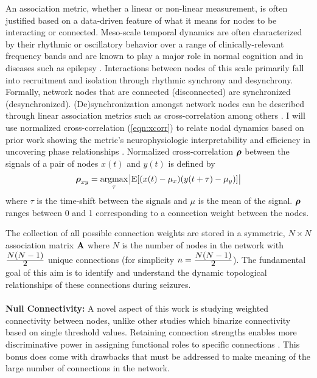 An association metric, whether a linear or non-linear measurement, is often justified based on a data-driven feature of what it means for nodes to be interacting or connected. Meso-scale temporal dynamics are often characterized by their rhythmic or oscillatory behavior over a range of clinically-relevant frequency bands and are known to play a major role in normal cognition \cite{buzsaki2006rhythms} and in diseases such as epilepsy \cite{uhlhaas2006neural, jiruska2012synchronization}. Interactions between nodes of this scale primarily fall into recruitment and isolation through rhythmic synchrony and desynchrony. Formally, network nodes that are connected (disconnected) are synchronized (desynchronized). (De)synchronization amongst network nodes can be described through linear association metrics such as cross-correlation among others \cite{pereda2005nonlinear}. I will use normalized cross-correlation (\ref{eqn:xcorr}) to relate nodal dynamics based on prior work showing the metric's neurophysiologic interpretability and efficiency in uncovering phase relationships \cite{schiff2005neuronal, kramer2010coalescence}. Normalized cross-correlation $\boldsymbol{\displaystyle \rho}$ between the signals of a pair of nodes $x(t)$ and $y(t)$ is defined by
\begin{eqnarray}
\label{eqn:xcorr}
    \boldsymbol{\displaystyle \rho}_{xy} = \underset{\tau}{\operatorname{argmax}}\:{\abs{\mathrm{E}[(x(t) - \mu_{x})(y(t+\tau) - \mu_{y})]}}
\end{eqnarray}
where $\tau$ is the time-shift between the signals and $\mu$ is the mean of the signal. $\boldsymbol{\displaystyle \rho}$ ranges between 0 and 1 corresponding to a connection weight between the nodes.

The collection of all possible connection weights are stored in a symmetric, $N \times N$ association matrix $\mathbf{\displaystyle A}$ where $N$ is the number of nodes in the network with $\frac{\displaystyle N(N-1)}{\displaystyle 2}$ unique connections (for simplicity $n=\frac{\displaystyle N(N-1)}{\displaystyle 2}$). The fundamental goal of this aim is to identify and understand the dynamic topological relationships of these connections during seizures.
~\\
~\\
\textbf{Null Connectivity:}
A novel aspect of this work is studying weighted connectivity between nodes, unlike other studies which binarize connectivity based on single threshold values. Retaining connection strengths enables more discriminative power in assigning functional roles to specific connections \cite{bullmore2011brain}. This bonus does come with drawbacks that must be addressed to make meaning of the large number of connections in the network.

